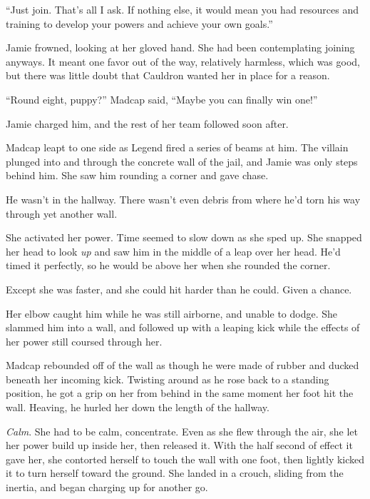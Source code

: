 ``Just join.  That's all I ask.  If nothing else, it would mean you had resources and training to develop your powers and achieve your own goals.''



Jamie frowned, looking at her gloved hand.  She had been contemplating joining anyways.  It meant one favor out of the way, relatively harmless, which was good, but there was little doubt that Cauldron wanted her in place for a reason.



\blacksquare



``Round eight, puppy?''  Madcap said, ``Maybe you can finally win one!''



Jamie charged him, and the rest of her team followed soon after.



Madcap leapt to one side as Legend fired a series of beams at him.  The villain plunged into and through the concrete wall of the jail, and Jamie was only steps behind him.  She saw him rounding a corner and gave chase.



He wasn't in the hallway.  There wasn't even debris from where he'd torn his way through yet another wall.



She activated her power.  Time seemed to slow down as she sped up.  She snapped her head to look \emph{up} and saw him in the middle of a leap over her head.  He'd timed it perfectly, so he would be above her when she rounded the corner.



Except she was faster, and she could hit harder than he could.  Given a chance.



Her elbow caught him while he was still airborne, and unable to dodge.  She slammed him into a wall, and followed up with a leaping kick while the effects of her power still coursed through her.



Madcap rebounded off of the wall as though he were made of rubber and ducked beneath her incoming kick.  Twisting around as he rose back to a standing position, he got a grip on her from behind in the same moment her foot hit the wall.  Heaving, he hurled her down the length of the hallway.



\emph{Calm}.  She had to be calm, concentrate.  Even as she flew through the air, she let her power build up inside her, then released it.  With the half second of effect it gave her, she contorted herself to touch the wall with one foot, then lightly kicked it to turn herself toward the ground.  She landed in a crouch, sliding from the inertia, and began charging up for another go.



